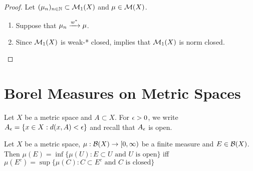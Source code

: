 \documentclass{book}
\begin{document}
	\begin{proof} Let $(\mu_n)_{n \in \mathbb{N}} \subset \mathcal{M}_1(X)$ and $\mu \in \mathcal{M}(X)$. 
		\begin{enumerate}
			\item Suppose that $\mu_n \xrightarrow{w^*} \mu$.
			\item Since $\mathcal{M}_1(X)$ is weak-* closed,  implies that $\mathcal{M}_1(X)$ is norm closed.
		\end{enumerate}
	\end{proof}
































	
	
	
	
	
	
	
	
	

	
	
	
	
	
	
	
	
	
	
	
	
	\newpage
	\section{Borel Measures on Metric Spaces}
	\begin{note}
		Let $X$ be a metric space and $A \subset X$. For $\epsilon >0$, we write $A_{\epsilon} = \{x \in X: d(x, A) < \epsilon\}$ and recall that $A_{\epsilon}$ is open.
	\end{note}

	\begin{ex}
		Let $X$ be a metric space, $\mu: \mathcal{B}(X) \rightarrow [0,\infty)$ be a finite measure and $E \in \mathcal{B}(X)$. Then 
		$\mu(E) = \inf  \{\mu(U): E \subset U \text{ and $U$ is open} \}$ iff $\mu(E^c) = \sup  \{\mu(C): C \subset E^c \text{ and $C$ is closed} \}$ \\
	\end{ex}
\end{document}
